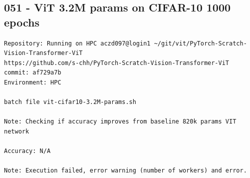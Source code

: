 \subsection{051 - ViT 3.2M params on CIFAR-10 1000 epochs}
\label{app_res:051}
\begin{verbatim}
Repository: Running on HPC aczd097@login1 ~/git/vit/PyTorch-Scratch-Vision-Transformer-ViT
https://github.com/s-chh/PyTorch-Scratch-Vision-Transformer-ViT
commit: af729a7b
Environment: HPC

batch file vit-cifar10-3.2M-params.sh

Note: Checking if accuracy improves from baseline 820k params VIT network

Accuracy: N/A

Note: Execution failed, error warning (number of workers) and error.


\end{verbatim}
